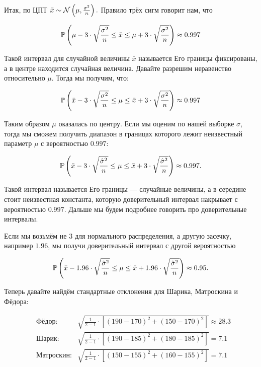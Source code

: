 \documentclass[12pt, a4paper, oneside]{article}
\begin{document}
\begin{sol} 

Итак, по ЦПТ  $\bar{x} \sim \mathcal{N} \left(\mu, \frac{\sigma^2}{n} \right).$ Правило трёх сигм говорит нам, что 

$$
\mathbb{P} \left( \mu - 3 \cdot \sqrt{\frac{\sigma^2}{n}}  \le \bar{x} \le \mu + 3 \cdot \sqrt{\frac{\sigma^2}{n}} \right) \approx 0.997
$$

Такой интервал для случайной величины $\bar{x}$ называется  Его границы фиксированы, а в центре находится случайная величина. Давайте разрешим неравенство относительно $\mu$. Тогда мы получим, что:

$$
\mathbb{P}\left(\bar{x}  - 3 \cdot \sqrt{\frac{\sigma^2}{n}}  \le \mu \le \bar{x}  + 3 \cdot \sqrt{\frac{\sigma^2}{n}} \right) \approx 0.997
$$

Таким образом $\mu$ оказалась по центру. Если мы оценим по нашей выборке $\sigma$, тогда мы сможем получить диапазон в границах которого лежит неизвестный параметр $\mu$ с вероятностью $0.997$:

$$
\mathbb{P}\left(\bar{x}  - 3 \cdot \sqrt{\frac{\hat{\sigma}^2}{n}}  \le \mu \le \bar{x}  + 3 \cdot \sqrt{\frac{\hat{\sigma}^2}{n}} \right) \approx 0.997.
$$

Такой интервал называется  Его границы --- случайные величины, а в середине стоит неизвестная константа, которую доверительный интервал накрывает с вероятностью $0.997$.  Дальше мы будем подробнее говорить про доверительные интервалы. 

Если мы возьмём не $3$ для нормального распределения, а другую засечку, например $1.96$, мы получи доверительный интервал с другой вероятностью 

$$
\mathbb{P}\left(\bar{x}  - 1.96 \cdot \sqrt{\frac{\hat{\sigma}^2}{n}}  \le \mu \le \bar{x}  + 1.96 \cdot \sqrt{\frac{\hat{\sigma}^2}{n}} \right) \approx 0.95.
$$

Теперь давайте найдём стандартные отклонения для Шарика, Матроскина и Фёдора:

\begin{equation*} 
\begin{aligned} 
& \text{Фёдор:}  & \sqrt{ \frac{1}{2-1} \cdot \left[ (190 - 170)^2 + (150 - 170)^2 \right] } \approx 28.3 \\
& \text{Шарик:}  & \sqrt{ \frac{1}{2-1} \cdot \left[ (190 - 185)^2 + (180 - 185)^2 \right] } = 7.1 \\
& \text{Матроскин:} & \sqrt{ \frac{1}{2-1} \cdot \left[ (150 - 155)^2 + (160 - 155)^2 \right] }= 7.1 \\
\end{aligned}
\end{equation*}


\end{sol}
\end{document}
